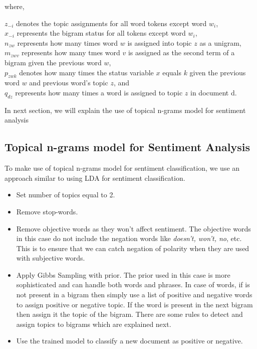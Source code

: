 where, 

\(z_{-i}\) denotes the topic assignments for all word tokens except word \(w_i\), \\ 
\(x_{-i}\) represents the bigram status for all tokens except word \(w_i\), \\ 
\(n_{zw}\) represents how many times word \(w\) is assigned into topic \(z\) as a unigram, \\
\(m_{zwv}\) represents how many tmes word \(v\) is assigned as the second term of a bigram given the previous word \(w\), \\
\(p_{zwk}\) denotes how many times the status variable \(x\) equals \(k\) given the previous word \(w\) and previous word's topic \(z\), and \\
\(q_{dz}\) represents how many times a word is assigned to topic \(z\) in document d.

In next section, we will explain the use of topical n-grams model for sentiment analysis

\subsection{Topical n-grams model for Sentiment Analysis}

To make use of topical n-grams model for sentiment classification, we use an approach similar to using LDA for sentiment classification.

\begin{itemize}
 \itemsep0em
 \item Set number of topics equal to 2.
 \item Remove stop-words.
 \item Remove objective words as they won't affect sentiment. The objective words in this case do not include the negation words like \textit{doesn't, won't, no}, etc. This
 is to ensure that we can catch negation of polarity when they are used with subjective words.
 \item Apply Gibbs Sampling with prior. The prior used in this case is more sophisticated and can handle both words and phrases. In case of words, if is not present in a 
 bigram then simply use a list of positive and negative words to assign positive or negative topic. If the word is present in the next bigram then assign it the topic of the bigram. 
 There are some rules to detect and assign topics to bigrams which are explained next.
 \item Use the trained model to classify a new document as positive or negative.
\end{itemize}

